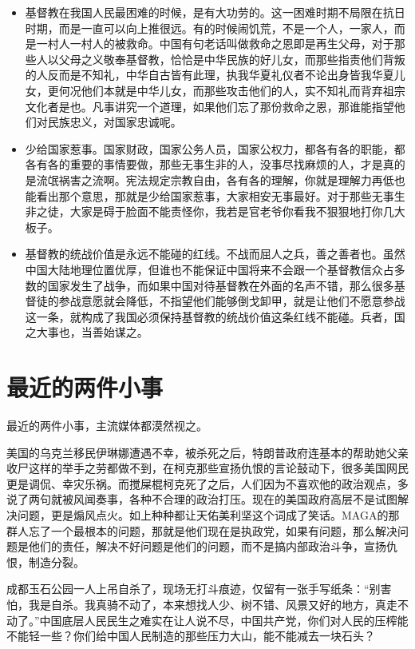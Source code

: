 \documentclass[12pt,oneside]{book}
\begin{document}
\begin{itemize}
\item 基督教在我国人民最困难的时候，是有大功劳的。这一困难时期不局限在抗日时期，而是一直可以向上推很远。有的时候闹饥荒，不是一个人，一家人，而是一村人一村人的被救命。中国有句老话叫做救命之恩即是再生父母，对于那些人以父母之义敬奉基督教，恰恰是中华民族的好儿女，而那些指责他们背叛的人反而是不知礼，中华自古皆有此理，执我华夏礼仪者不论出身皆我华夏儿女，更何况他们本就是中华儿女，而那些攻击他们的人，实不知礼而背弃祖宗文化者是也。凡事讲究一个道理，如果他们忘了那份救命之恩，那谁能指望他们对民族忠义，对国家忠诚呢。
\item 少给国家惹事。国家财政，国家公务人员，国家公权力，都各有各的职能，都各有各的重要的事情要做，那些无事生非的人，没事尽找麻烦的人，才是真的是流氓祸害之流啊。宪法规定宗教自由，各有各的理解，你就是理解力再低也能看出那个意思，那就是少给国家惹事，大家相安无事最好。对于那些无事生非之徒，大家是碍于脸面不能责怪你，我若是官老爷你看我不狠狠地打你几大板子。
\item 基督教的统战价值是永远不能碰的红线。不战而屈人之兵，善之善者也。虽然中国大陆地理位置优厚，但谁也不能保证中国将来不会跟一个基督教信众占多数的国家发生了战争，而如果中国对待基督教在外面的名声不错，那么很多基督徒的参战意愿就会降低，不指望他们能够倒戈卸甲，就是让他们不愿意参战这一条，就构成了我国必须保持基督教的统战价值这条红线不能碰。兵者，国之大事也，当善始谋之。
\end{itemize}






\chapter{最近的两件小事}
最近的两件小事，主流媒体都漠然视之。

美国的乌克兰移民伊琳娜遭遇不幸，被杀死之后，特朗普政府连基本的帮助她父亲收尸这样的举手之劳都做不到，在柯克那些宣扬仇恨的言论鼓动下，很多美国网民更是调侃、幸灾乐祸。而搅屎棍柯克死了之后，人们因为不喜欢他的政治观点，多说了两句就被风闻奏事，各种不合理的政治打压。现在的美国政府高层不是试图解决问题，更是煽风点火。如上种种都让天佑美利坚这个词成了笑话。MAGA的那群人忘了一个最根本的问题，那就是他们现在是执政党，如果有问题，那么解决问题是他们的责任，解决不好问题是他们的问题，而不是搞内部政治斗争，宣扬仇恨，制造分裂。

成都玉石公园一人上吊自杀了，现场无打斗痕迹，仅留有一张手写纸条：“别害怕，我是自杀。我真骑不动了，本来想找人少、树不错、风景又好的地方，真走不动了。”中国底层人民民生之难实在让人说不尽，中国共产党，你们对人民的压榨能不能轻一些？你们给中国人民制造的那些压力大山，能不能减去一块石头？
\end{document}
